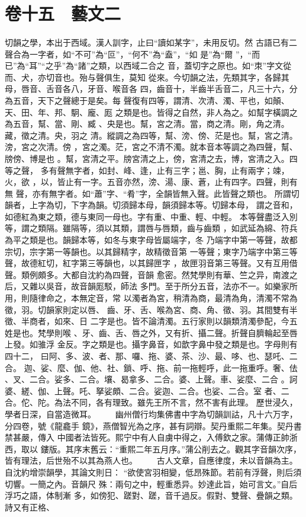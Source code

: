 \documentclass{ctexart}
\begin{document}
\section{卷十五　藝文二}
\paragraph{}
切韻之學，本出于西域。漢人訓字，止曰``讀如某字''，未用反切。然 古語已有二聲合為一字者，如``不可''為``叵''，``何不''為``盍''，``如 是''為``爾 ''，``而已''為``耳''``之乎''為``諸''之類，以西域二合之 音，蓋切字之原也。如``朿''字文從而、犬，亦切音也。殆与聲俱生，莫知 從來。今切韻之法，先類其字，各歸其母，唇音、舌音各八，牙音、喉音各 四，齒音十，半齒半舌音二，凡三十六，分為五音，天下之聲總于是矣。每 聲復有四等，謂清、次清、濁、平也，如顛、天、田、年、邦、駉、龐、厖 之類是也。皆得之自然，非人為之。如幫字橫調之為五音，幫、當、剛、臧 、央是也。幫，宮之清。當，商之清。剛，角之清。藏，徵之清。央，羽之 清。縱調之為四等，幫、滂、傍、茫是也。幫，宮之清。滂，宮之次清。傍 ，宮之濁。茫，宮之不清不濁。就本音本等調之為四聲，幫、牓傍、博是也 。幫，宮清之平。牓宮清之上，傍，宮清之去，博，宮清之入。四等之聲， 多有聲無字者，如封、峰、逢，止有三字；邕、胸，止有兩字；竦，火，欲 ，以，皆止有一字。五音亦然，滂、湯、康、蒼，止有四字。四聲，則有無 聲，亦有無字者。如``蕭''字、``肴''字，全韻皆無入聲。此皆聲之類也。 所謂切韻者，上字為切，下字為韻。切須歸本母，韻須歸本等。切歸本母， 謂之音和，如德紅為東之類，德与東同一母也。字有重、中重、輕、中輕。 本等聲盡泛入別等，謂之類隔。雖隔等，須以其類，謂唇与唇類，齒与齒類 ，如武延為綿、符兵為平之類是也。韻歸本等，如冬与東字母皆屬端字，冬 乃端字中第一等聲，故都宗切，宗字第一等韻也。以其歸精字，故精徵音第 一等聲；東字乃端字中第三等聲，故德紅切，紅字第三等韻也，以其歸匣字 ，故匣羽音第三等聲。又有互用借聲。類例頗多。大都自沈約為四聲，音韻 愈密。然梵學則有華、竺之异，南渡之后，又雜以吳音，故音韻厖駁，師法 多門。至于所分五音，法亦不一。如樂家所用，則隨律命之，本無定音，常 以濁者為宮，稍清為商，最清為角，清濁不常為徵，羽。切韻家則定以唇、 齒、牙、舌、喉為宮、商、角、徵、羽。其間雙有半徵、半商者，如來、日 二字是也。皆不論清濁。五行家則以韻類清濁參配，今五姓是也。梵學則喉 、牙、齒、舌、唇之外，又有折、攝二聲。折聲自臍輪起至唇上發。如骓浮 金反。字之類是也。攝字鼻音，如歆字鼻中發之類是也。字母則有四十二， 曰阿、多、波、者、那、囉、拖、婆、茶、沙、最、哆、也、瑟吒、二合。 迦、娑、麼、伽、他、社、鎖、呼、拖、前一拖輕呼，此一拖重呼。奢、佉 、叉、二合。娑多、二合。壤、曷拿多、二合。婆、上聲。車、娑麼、二合 。訶婆、縒、伽、上聲。吒、拏娑頗、二合。娑迦、二合。也娑、二合。室 者、二合。佗、陀。為法不同，各有理致。雖先王所不言，然不害有此理。 歷世浸久，學者日深，自當造微耳。 　　幽州僧行均集佛書中字為切韻訓詁，凡十六万字，分四卷，號《龍龕手 鏡》，燕僧智光為之序，甚有詞辯。契丹重熙二年集。契丹書禁甚嚴，傳入 中國者法皆死。熙宁中有人自虜中得之，入傅欽之家。蒲傳正帥浙西，取以 鏤版。其序末舊云：``重熙二年五月序。''蒲公削去之。觀其字音韻次序， 皆有理法，后世殆不以其為燕人也。 　　古人文章，自應律度，未以音韻為主。自沈約增崇韻學，其論文則日： ``欲使宮羽相變，低昂殊節。若前有浮聲，則后須切響。一簡之內。音韻尺 殊：兩句之中，輕重悉异。妙達此旨，始可言文。''自后浮巧之語，体制漸 多，如傍犯、蹉對、蹉，音千過反。假對、雙聲、疊韻之類。詩又有正格、 
\end{document}

